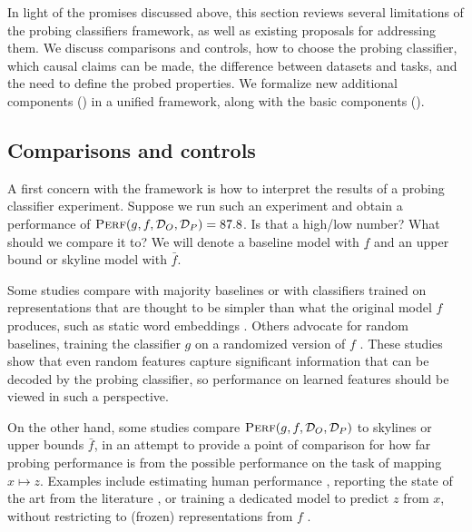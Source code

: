 \documentclass[discussion]{clv3}
\begin{document}
In light of the promises discussed above, this section reviews several limitations of the probing classifiers framework, as well as existing proposals for addressing them. We discuss comparisons and controls, how to choose the probing classifier, which causal claims can be made, the difference between datasets and tasks, and the need to define the probed properties. 
We formalize new additional components () in a unified framework, along with the basic components (). 


\subsection{Comparisons and controls} 

A first concern with the framework is how to interpret the results of a probing classifier experiment. 
Suppose we run such an experiment and obtain a performance of $\textsc{Perf}(g, f, \mathcal{D}_O, \mathcal{D}_P) = 87.8$. Is that a high/low number? What should we compare it to? 
We will denote a baseline model with $\underline{f}$ and an upper bound or skyline model with $\bar{f}$. 

Some studies compare with majority baselines \cite{belinkov-etal-2017-neural,conneau-etal-2018-cram} or with classifiers trained on representations that are thought to be simpler than what the original model $f$ produces, such as static word embeddings \cite{belinkov-etal-2017-neural,tenney2018what}.  Others advocate for random baselines, training the classifier $g$ on a randomized version of $f$ \cite{conneau-etal-2018-cram,zhang-bowman-2018-language,tenney2018what,chrupala-etal-2020-analyzing}. These studies show that even random features capture significant information that can be decoded by the probing classifier, so performance on learned features should be viewed in such a perspective. 

On the other hand, some studies compare $\textsc{Perf}(g, f, \mathcal{D}_O, \mathcal{D}_P)$ to skylines or upper bounds $\bar{f}$, in an attempt to provide a point of comparison for how far probing performance is from the possible performance on the task of mapping $x \mapsto z$. 
Examples include estimating human performance \cite{conneau-etal-2018-cram}, reporting the state of the art from the literature \cite{liu-etal-2019-linguistic}, or training a dedicated model to predict $z$ from $x$, without restricting to (frozen) representations from $f$ \cite{belinkov-etal-2017-evaluating}. 
\end{document}
